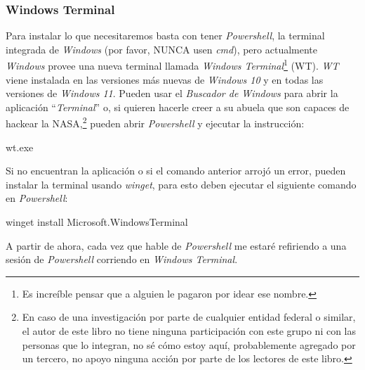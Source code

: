 \subsubsection{Windows Terminal}
  Para instalar lo que necesitaremos basta con tener \textit{Powershell}, la terminal integrada de
  \textit{Windows} (por favor, NUNCA usen \textit{cmd}), pero actualmente \textit{Windows} provee
  una nueva terminal llamada \textit{Windows Terminal}\footnote{
    Es increíble pensar que a alguien le pagaron por idear ese nombre.
  } (WT).
  \textit{WT} viene instalada en las 
  versiones más nuevas de \textit{Windows 10} y en todas las versiones de \textit{Windows 11}.
  Pueden usar el \textit{Buscador de Windows} para abrir la aplicación \enquote{\textit{Terminal}}
  o, si quieren hacerle creer a su abuela que son capaces de hackear la NASA,\footnote{En caso de 
  una investigación por parte de cualquier entidad federal o similar, el autor de este libro no 
  tiene ninguna participación con este grupo ni con las personas que lo integran, no sé cómo 
  estoy aquí, probablemente agregado por un tercero, no apoyo ninguna acción por parte de los 
  lectores de este libro.} pueden abrir \textit{Powershell} y ejecutar la instrucción:
  \begin{powershell}
    wt.exe
  \end{powershell}

  Si no encuentran la aplicación o si el comando anterior arrojó un error, pueden instalar la 
  terminal usando \textit{winget}, para esto deben ejecutar el siguiente comando en 
  \textit{Powershell}:
  \begin{powershell}
    winget install Microsoft.WindowsTerminal
  \end{powershell}

  A partir de ahora, cada vez que hable de \textit{Powershell} me estaré refiriendo a una sesión
  de \textit{Powershell} corriendo en \textit{Windows Terminal}.

